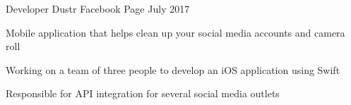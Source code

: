 

\begin{cventries}

  \cventry
    {Developer} %
    {Dustr} %
    {Facebook Page} %
    {July 2017} %
    {
      \begin{cvitems} %
        \item {Mobile application that helps clean up your social media accounts and camera roll}
        \item {Working on a team of three people to develop an iOS application using Swift}
        \item {Responsible for API integration for several social media outlets}
      \end{cvitems}
    }

\end{cventries}

